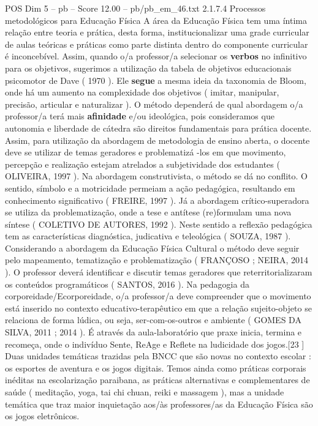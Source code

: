 \begin{textsample}{POS Dim 5 – pb – Score 12.00 – pb/pb\_em\_46.txt}  \label{ex:f5_pos_093}
2.1.7.4 Processos metodológicos para Educação Física A área da Educação Física tem uma íntima relação entre teoria e prática, desta forma, institucionalizar uma grade curricular de aulas teóricas e práticas como parte distinta dentro do componente curricular é inconcebível.
Assim, quando o/a professor/a selecionar os \textbf{verbos} no infinitivo para os objetivos, sugerimos a utilização da tabela de objetivos educacionais psicomotor de Dave ( 1970 ).
Ele \textbf{segue} a mesma ideia da taxonomia de Bloom, onde há um aumento na complexidade dos objetivos ( imitar, manipular, precisão, articular e naturalizar ).
O método dependerá de qual abordagem o/a professor/a terá mais \textbf{afinidade} e/ou ideológica, pois consideramos que autonomia e liberdade de cátedra são direitos fundamentais para prática docente.
Assim, para utilização da abordagem de metodologia de ensino aberta, o docente deve se utilizar de temas geradores e problematizá -los em que movimento, percepção e realização estejam atrelados a subjetividade dos estudantes ( OLIVEIRA, 1997 ).
Na abordagem construtivista, o método se dá no conflito.
O sentido, símbolo e a motricidade permeiam a ação pedagógica, resultando em conhecimento significativo ( FREIRE, 1997 ).
Já a abordagem crítico-superadora se utiliza da problematização, onde a tese e antítese (re)formulam uma nova síntese ( COLETIVO DE AUTORES, 1992 ).
Neste sentido a reflexão pedagógica tem as características diagnóstica, judicativa e teleológica ( SOUZA, 1987 ).
Considerando a abordagem da Educação Física Cultural o método deve seguir pelo mapeamento, tematização e problematização ( FRANÇOSO ; NEIRA, 2014 ).
O professor deverá identificar e discutir temas geradores que reterritorializaram os conteúdos programáticos ( SANTOS, 2016 ).
Na pedagogia da corporeidade/Ecorporeidade, o/a professor/a deve compreender que o movimento está inserido no contexto educativo-terapêutico em que a relação sujeito-objeto se relaciona de forma lúdica, ou seja, ser-com-os-outros e ambiente ( GOMES DA SILVA, 2011 ; 2014 ).
É através da aula-laboratório que praxe inicia, termina e recomeça, onde o indivíduo Sente, ReAge e Reflete na ludicidade dos jogos.[23 ] Duas unidades temáticas trazidas pela BNCC que são novas no contexto escolar : os esportes de aventura e os jogos digitais.
Temos ainda como práticas corporais inéditas na escolarização paraibana, as práticas alternativas e complementares de saúde ( meditação, yoga, tai chi chuan, reiki e massagem ), mas a unidade temática que traz maior inquietação aos/às professores/as da Educação Física são os jogos eletrônicos.

\end{textsample}
